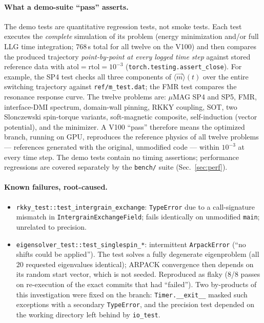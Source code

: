 \documentclass[11pt,a4paper]{article}
\begin{document}
\paragraph{What a demo-suite ``pass'' asserts.}
The demo tests are quantitative regression tests, not smoke tests. Each test
executes the \emph{complete} simulation of its problem (energy minimization
and/or full LLG time integration; 768\,s total for all twelve on the V100) and
then compares the produced trajectory \emph{point-by-point at every logged time
step} against stored reference data with
$\mathrm{atol}=\mathrm{rtol}=10^{-3}$ (\texttt{torch.testing.assert\_close}).
For example, the SP4 test checks all three components of
$\langle\vec m\rangle(t)$ over the entire switching trajectory against
\texttt{ref/m\_test.dat}; the FMR test compares the resonance response curve.
The twelve problems are: $\mu$MAG SP4 and SP5, FMR, interface-DMI spectrum,
domain-wall pinning, RKKY coupling, SOT, two Slonczewski spin-torque variants,
soft-magnetic composite, self-induction (vector potential), and the
minimizer. A V100 ``pass'' therefore means the optimized branch, running on
GPU, reproduces the reference physics of all twelve problems --- references
generated with the original, unmodified code --- within $10^{-3}$ at every
time step. The demo tests contain no timing assertions; performance
regressions are covered separately by the \texttt{bench/} suite
(Sec.~\ref{sec:perf}).

\paragraph{Known failures, root-caused.}
\begin{itemize}
\item \texttt{rkky\_test::test\_intergrain\_exchange}: \texttt{TypeError} due to a
      call-signature mismatch in \texttt{IntergrainExchangeField}; fails
      identically on unmodified \texttt{main}; unrelated to precision.
\item \texttt{eigensolver\_test::test\_singlespin\_*}: intermittent
      \texttt{ArpackError} (``no shifts could be applied''). The test solves a
      fully degenerate eigenproblem (all 20 requested eigenvalues identical);
      ARPACK convergence then depends on its random start vector, which is not
      seeded. Reproduced as flaky (8/8 passes on re-execution of the exact
      commits that had ``failed''). Two by-products of this investigation were
      fixed on the branch: \texttt{Timer.\_\_exit\_\_} masked such exceptions
      with a secondary \texttt{TypeError}, and the precision test depended on
      the working directory left behind by \texttt{io\_test}.
\end{itemize}
\end{document}
